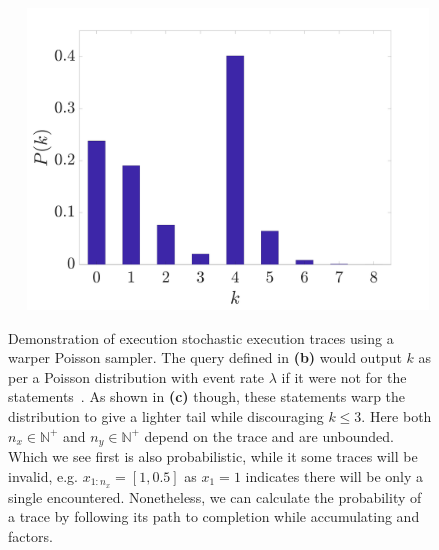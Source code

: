 \begin{figure}[p]
\begin{minipage}[b]{0.49\textwidth}
		\end{minipage}
				\begin{minipage}[b]{0.49\textwidth}
					\centering	~~
					\includegraphics[width=0.95\textwidth]{probprog/figures/poisson_plot.pdf}			
				\end{minipage}
	\caption{Demonstration of execution stochastic execution traces using a warper
		Poisson sampler.  The query defined in \textbf{(b)} would output $k$ as per a Poisson
		distribution with event rate $\lambda$ if it were not for the \observe statements~\citep{paige2017thesis}.
		As shown in \textbf{(c)} though, these \observe statements warp the distribution to
		give a lighter tail while discouraging $k\le3$.   Here both $n_x \in \mathbb{N}^+$ and
		$n_y \in \mathbb{N}^+$ depend on the trace and are unbounded.  Which
		\observe we see first is also probabilistic, while it some traces will be invalid, e.g. $x_{1:n_x}=[1,0.5]$
		as $x_1=1$ indicates there will be only a single \sample encountered.  Nonetheless, we can
		calculate the probability of a trace by following its path to completion while
		accumulating \sample and \observe factors.
		\label{fig:probprog:poisson}}
\end{figure}


